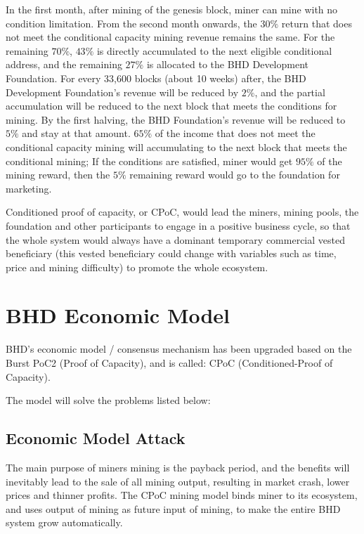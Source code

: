 \begin{flushleft}
    In the first month, after mining of the genesis block, miner can mine with no condition limitation. From the second month onwards, the $30\%$ return that does not meet the conditional capacity mining revenue remains the same. For the remaining $70\%$, $43\%$ is directly accumulated to the next eligible conditional address, and the remaining $27\%$ is allocated to the BHD Development Foundation. For every 33,600 blocks (about 10 weeks) after, the BHD Development Foundation's revenue will be reduced by $2\%$, and the partial accumulation will be reduced to the next block that meets the conditions for mining. By the first halving, the BHD Foundation's revenue will be reduced to $5\%$ and stay at that amount. $65\%$ of the income that does not meet the conditional capacity mining will accumulating to the next block that meets the conditional mining; If the conditions are satisfied, miner would get $95\%$ of the mining reward, then the $5\%$ remaining reward would go to the foundation for marketing.
\end{flushleft}
\begin{flushleft}
    Conditioned proof of capacity, or CPoC, would lead the miners, mining pools, the foundation and other participants to engage in a positive business cycle, so that the whole system would always have a dominant temporary commercial vested beneficiary (this vested beneficiary could change with variables such as time, price and mining difficulty) to promote the whole ecosystem.
\end{flushleft}
\section{BHD Economic Model}
\begin{flushleft}
    BHD's economic model / consensus mechanism has been upgraded based on the Burst PoC2 (Proof of Capacity), and is called: CPoC (Conditioned-Proof of Capacity).
\end{flushleft}
\begin{flushleft}
    The model will solve the problems listed below:
\end{flushleft}
\subsection{Economic Model Attack}
\begin{flushleft}
    The main purpose of miners mining is the payback period, and the benefits will inevitably lead to the sale of all mining output, resulting in market crash, lower prices and thinner profits. The CPoC mining model binds miner to its ecosystem, and uses output of mining as future input of mining, to make the entire BHD system grow automatically.
\end{flushleft}
